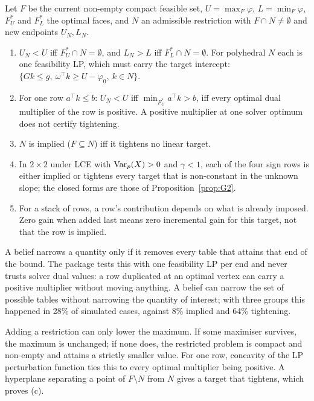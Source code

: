 \begin{proposition}\label{prop:R2}
Let $F$ be the current non-empty compact feasible set, $U=\max_F\varphi$,
$L=\min_F\varphi$, $F^*_U$ and $F^*_L$ the optimal faces, and $N$ an admissible
restriction with $F\cap N\neq\emptyset$ and new endpoints $U_N,L_N$.
\begin{enumerate}[label=(\alph*)]
\item $U_N<U$ iff $F^*_U\cap N=\emptyset$, and $L_N>L$ iff $F^*_L\cap N=\emptyset$.
For polyhedral $N$ each is one feasibility LP, which must carry the target
intercept: $\{Gk\le g,\ \omega^\top k\ge U-\varphi_0,\ k\in N\}$.
\item For one row $a^\top k\le b$: $U_N<U$ iff $\min_{F^*_U}a^\top k>b$, iff every
optimal dual multiplier of the row is positive. A positive multiplier at one
solver optimum does not certify tightening.
\item $N$ is implied ($F\subseteq N$) iff it tightens no linear target.
\item In $2\times2$ under LCE with $\operatorname{Var}_p(X)>0$ and $\gamma<1$, each of the four sign
rows is either implied or tightens every target that is non-constant in the
unknown slope; the closed forms are those of Proposition~\ref{prop:G2}.
\item For a stack of rows, a row's contribution depends on what is already
imposed. Zero gain when added last means zero incremental gain for this target,
not that the row is implied.
\end{enumerate}
\end{proposition}
\begin{reading}
A belief narrows a quantity only if it removes every table that attains that end
of the bound. The package tests this with one feasibility LP per end and never
trusts solver dual values: a row duplicated at an optimal vertex can carry a
positive multiplier without moving anything. A belief can narrow the set of
possible tables without narrowing the quantity of interest; with three groups this
happened in 28\% of simulated cases, against 8\% implied and 64\% tightening.
\end{reading}
\begin{sketch}
Adding a restriction can only lower the maximum. If some maximiser survives, the
maximum is unchanged; if none does, the restricted problem is compact and
non-empty and attains a strictly smaller value. For one row, concavity of the LP
perturbation function ties this to every optimal multiplier being positive. A
hyperplane separating a point of $F\setminus N$ from $N$ gives a target that
tightens, which proves (c).
\end{sketch}

